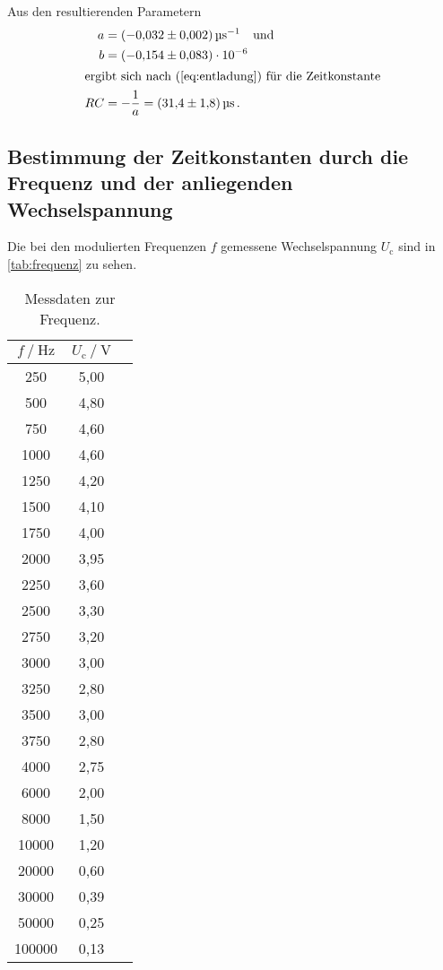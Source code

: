 Aus den resultierenden Parametern
\begin{align*}
  a &= \qty[per-mode=reciprocal]{-0.032(002)}{\per\micro\second} \quad \text{und} \\
  b &= (\num{-0.154(083)}) \cdot 10^{-6} \\
  \intertext{ergibt sich nach (\ref{eq:entladung}) für die Zeitkonstante}
  RC &= - \frac{1}{a} = \qty{31.4(1.8)}{\micro\second} \, .
\end{align*}


\subsection{Bestimmung der Zeitkonstanten durch die Frequenz und der anliegenden Wechselspannung}

Die bei den modulierten Frequenzen $f$ gemessene Wechselspannung $U_\text{c}$  sind in \autoref{tab:frequenz} zu sehen. 
\begin{table} [h]
  \centering
  \caption{Messdaten zur Frequenz.}
  \label{tab:frequenz}
  \begin{tabular}{c c c}
    \toprule
    $f \mathbin{/} \unit{\hertz}$ & $U_\text{c} \mathbin{/} \unit{\volt}$ \\
    \midrule
       250 & 5,00 \\
       500 & 4,80 \\
       750 & 4,60 \\
      1000 & 4,60 \\
      1250 & 4,20 \\
      1500 & 4,10 \\
      1750 & 4,00 \\
      2000 & 3,95 \\
      2250 & 3,60 \\
      2500 & 3,30 \\
      2750 & 3,20 \\
      3000 & 3,00 \\
      3250 & 2,80 \\
      3500 & 3,00 \\
      3750 & 2,80 \\
      4000 & 2,75 \\
      6000 & 2,00 \\
      8000 & 1,50 \\
     10000 & 1,20 \\
     20000 & 0,60 \\
     30000 & 0,39 \\
     50000 & 0,25 \\
    100000 & 0,13 \\
    \bottomrule
  \end{tabular}
\end{table}

